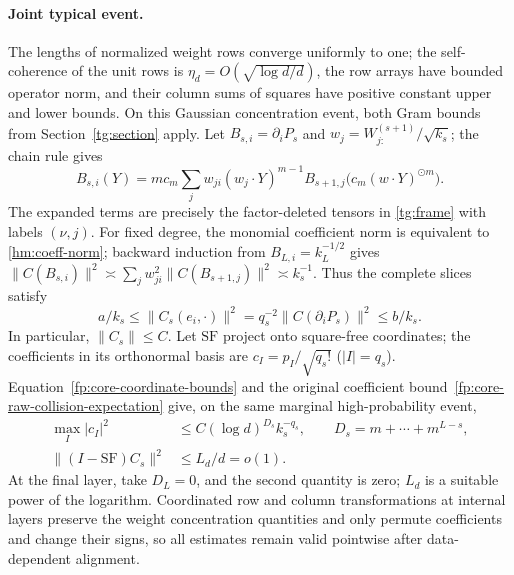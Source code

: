 \documentclass[a4paper]{tufte-handout}
\begin{document}
\begin{fullwidth}
\paragraph{Joint typical event.}
The lengths of normalized weight rows converge uniformly to one; the self-coherence of the unit rows is
$\eta_d=O(\sqrt{\log d/d})$, the row arrays have bounded operator norm, and their column sums of squares have positive constant upper and lower bounds.
On this Gaussian concentration event, both Gram bounds from Section~\ref{tg:section} apply.
Let $B_{s,i}=\partial_iP_s$ and $w_j=W^{(s+1)}_{j:}/\sqrt{k_s}$; the chain rule gives
\[
 B_{s,i}(Y)=mc_m\sum_jw_{ji}(w_j\cdot Y)^{m-1}
 B_{s+1,j}\big(c_m(w\cdot Y)^{\odot m}\big).
\]
The expanded terms are precisely the factor-deleted tensors in \eqref{tg:frame} with labels $(\nu,j)$.
For fixed degree, the monomial coefficient norm is equivalent to \eqref{hm:coeff-norm}; backward induction from
$B_{L,i}=k_L^{-1/2}$ gives
$\|C(B_{s,i})\|^2\asymp\sum_j w_{ji}^2\|C(B_{s+1,j})\|^2\asymp k_s^{-1}$.
Thus the complete slices satisfy
\begin{equation}\label{hm:mode}
 a/k_s\le\|C_s(e_i,\cdot)\|^2=q_s^{-2}\|C(\partial_iP_s)\|^2\le b/k_s.
\end{equation}
In particular, $\|C_s\|\le C$. Let $\mathrm{SF}$ project onto square-free coordinates;
the coefficients in its orthonormal basis are $c_I=p_I/\sqrt{q_s!}$ ($|I|=q_s$).
Equation~\eqref{fp:core-coordinate-bounds} and the original coefficient bound~\ref{fp:core-raw-collision-expectation}
give, on the same marginal high-probability event,
\begin{align}
 \max_I|c_I|^2&\le C(\log d)^{D_s}k_s^{-q_s},\qquad D_s=m+\cdots+m^{L-s},\label{hm:dense}\\
 \|(I-\mathrm{SF})C_s\|^2&\le L_d/d=o(1).\label{hm:collision}
\end{align}
At the final layer, take $D_L=0$, and the second quantity is zero; $L_d$ is a suitable power of the logarithm.
Coordinated row and column transformations at internal layers preserve the weight concentration quantities and only permute coefficients and change their signs,
so all estimates remain valid pointwise after data-dependent alignment.


\end{fullwidth}
\end{document}
